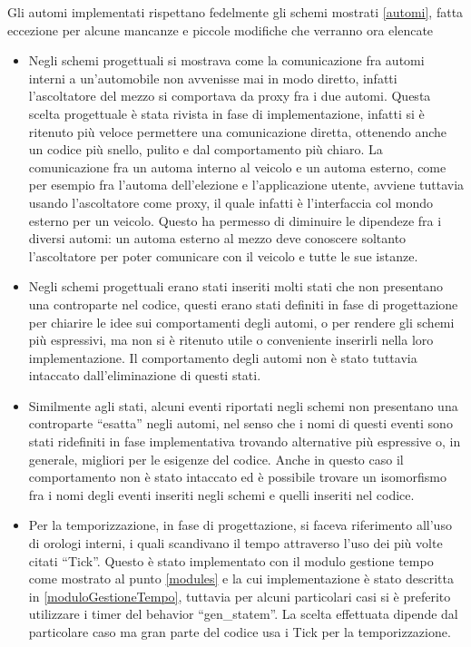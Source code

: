 Gli automi implementati rispettano fedelmente gli schemi mostrati \ref{automi}, fatta eccezione per alcune mancanze e piccole modifiche che verranno ora elencate

\begin{itemize}
	\item Negli schemi progettuali si mostrava come la comunicazione fra automi interni a un'automobile non avvenisse mai in modo diretto, infatti l'ascoltatore del mezzo si comportava da proxy fra i due automi. Questa scelta progettuale è stata rivista in fase di implementazione, infatti si è ritenuto più veloce permettere una comunicazione diretta, ottenendo anche un codice più snello, pulito e dal comportamento più chiaro. 
	La comunicazione fra un automa interno al veicolo e un automa esterno, come per esempio fra l'automa dell'elezione e l'applicazione utente, avviene tuttavia usando l'ascoltatore come proxy, il quale infatti è l'interfaccia col mondo esterno per un veicolo. Questo ha permesso di diminuire le dipendeze fra i diversi automi: un automa esterno al mezzo deve conoscere soltanto l'ascoltatore per poter comunicare con il veicolo e tutte le sue istanze.
	\item Negli schemi progettuali erano stati inseriti molti stati che non presentano una controparte nel codice, questi erano stati definiti in fase di progettazione per chiarire le idee sui comportamenti degli automi, o per rendere gli schemi più espressivi, ma non si è ritenuto utile o conveniente inserirli nella loro implementazione. Il comportamento degli automi non è stato tuttavia intaccato dall'eliminazione di questi stati. 
	\item Similmente agli stati, alcuni eventi riportati negli schemi non presentano una controparte ``esatta'' negli automi, nel senso che i nomi di questi eventi sono stati ridefiniti in fase implementativa trovando alternative più espressive o, in generale, migliori per le esigenze del codice. Anche in questo caso il comportamento non è stato intaccato ed è possibile trovare un isomorfismo fra i nomi degli eventi inseriti negli schemi e quelli inseriti nel codice.
	\item Per la temporizzazione, in fase di progettazione, si faceva riferimento all'uso di orologi interni, i quali scandivano il tempo attraverso l'uso dei più volte citati ``Tick''. Questo è stato implementato con il modulo gestione tempo come mostrato al punto \ref{modules} e la cui implementazione è stato descritta in \ref{moduloGestioneTempo}, tuttavia per alcuni particolari casi si è preferito utilizzare i timer del behavior ``gen\_statem''. La scelta effettuata dipende dal particolare caso ma gran parte del codice usa i Tick per la temporizzazione.
\end{itemize}


